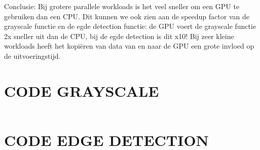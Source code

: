 \documentclass[11pt,twoside,a4paper]{article}
\begin{document}
Conclusie: Bij grotere parallele workloads is het veel sneller om een GPU te gebruiken dan een CPU. Dit kunnen we ook zien aan de speedup factor van de grayscale functie en de egde detection functie: de GPU voert de grayscale functie 2x sneller uit dan de CPU, bij de egde detection is dit x10! Bij zeer kleine workloads heeft het kopi\"eren van data van en naar de GPU een grote invloed op de uitvoeringstijd.


\newpage
\appendix


\section{CODE GRAYSCALE}\label{code_grayscale}
\inputminted[linenos=true, breaklines=true]{cuda}{main.cu}
\clearpage
\section{CODE EDGE DETECTION}\label{code_edge_detection}
\inputminted[linenos=true, breaklines=true]{cuda}{edge.cu}

\clearpage



\end{document}
